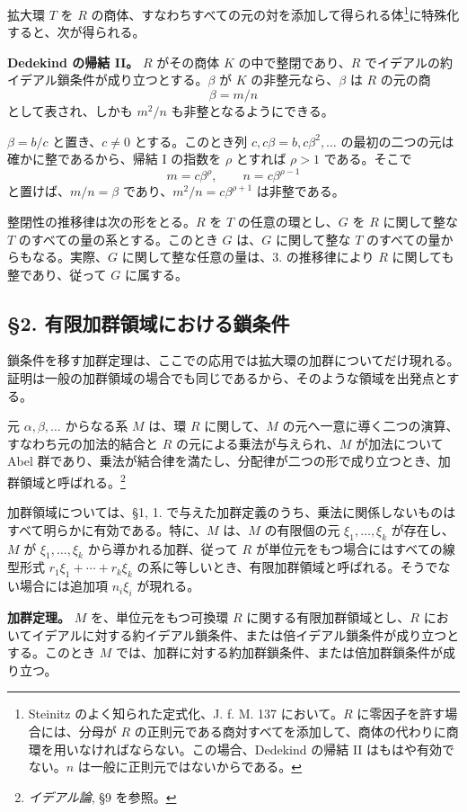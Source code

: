\documentclass[11pt]{article}
\begin{document}
拡大環 $T$ を $R$ の商体、すなわちすべての元の対を添加して得られる体\footnote{Steinitz のよく知られた定式化、J. f. M. 137 において。$R$ に零因子を許す場合には、分母が $R$ の正則元である商対すべてを添加して、商体の代わりに商環を用いなければならない。この場合、Dedekind の帰結 II はもはや有効でない。$n$ は一般に正則元ではないからである。}に特殊化すると、次が得られる。

\medskip
\noindent\textbf{Dedekind の帰結 II。} $R$ がその商体 $K$ の中で整閉であり、$R$ でイデアルの約イデアル鎖条件が成り立つとする。$\beta$ が $K$ の非整元なら、$\beta$ は $R$ の元の商
\[
        \beta=m/n
\]
として表され、しかも $m^2/n$ も非整となるようにできる。

$\beta=b/c$ と置き、$c\ne0$ とする。このとき列 $c,c\beta=b,c\beta^2,\ldots$ の最初の二つの元は確かに整であるから、帰結 I の指数を $\rho$ とすれば $\rho>1$ である。そこで
\[
        m=c\beta^\rho,\qquad n=c\beta^{\rho-1}
\]
と置けば、$m/n=\beta$ であり、$m^2/n=c\beta^{\rho+1}$ は非整である。

整閉性の推移律は次の形をとる。$R$ を $T$ の任意の環とし、$G$ を $R$ に関して整な $T$ のすべての量の系とする。このとき $G$ は、$G$ に関して整な $T$ のすべての量からもなる。実際、$G$ に関して整な任意の量は、3. の推移律により $R$ に関しても整であり、従って $G$ に属する。

\subsection*{§2. 有限加群領域における鎖条件}

鎖条件を移す加群定理は、ここでの応用では拡大環の加群についてだけ現れる。証明は一般の加群領域の場合でも同じであるから、そのような領域を出発点とする。

元 $\alpha,\beta,\ldots$ からなる系 $M$ は、環 $R$ に関して、$M$ の元へ一意に導く二つの演算、すなわち元の加法的結合と $R$ の元による乗法が与えられ、$M$ が加法について Abel 群であり、乗法が結合律を満たし、分配律が二つの形で成り立つとき、加群領域と呼ばれる。\footnote{\emph{イデアル論}, §9 を参照。}

加群領域については、§1, 1. で与えた加群定義のうち、乗法に関係しないものはすべて明らかに有効である。特に、$M$ は、$M$ の有限個の元 $\xi_1,\ldots,\xi_k$ が存在し、$M$ が $\xi_1,\ldots,\xi_k$ から導かれる加群、従って $R$ が単位元をもつ場合にはすべての線型形式 $r_1\xi_1+\cdots+r_k\xi_k$ の系に等しいとき、有限加群領域と呼ばれる。そうでない場合には追加項 $n_i\xi_i$ が現れる。

\medskip
\noindent\textbf{加群定理。} $M$ を、単位元をもつ可換環 $R$ に関する有限加群領域とし、$R$ においてイデアルに対する約イデアル鎖条件、または倍イデアル鎖条件が成り立つとする。このとき $M$ では、加群に対する約加群鎖条件、または倍加群鎖条件が成り立つ。
\end{document}
